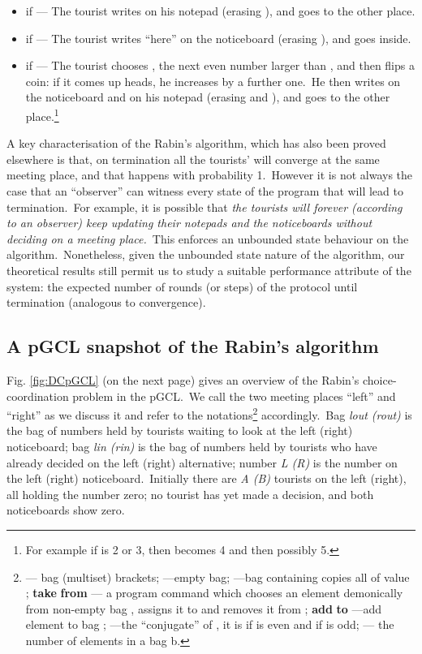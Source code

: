 \documentclass[numbers,copyright,creativecommons]{eptcs}
\begin{document}
\begin{itemize}
\item []if  --- The tourist writes  on his notepad (erasing ), and goes to the
        other place.
\item [] if  --- The tourist writes ``here'' on the noticeboard (erasing ), and
        goes inside.
\item [] if  --- The tourist chooses , the next even number larger than ,
        and then flips a coin: if it comes up heads, he increases  by a further one.\
        He then writes  on the noticeboard and on his notepad (erasing  and ),
        and goes to the other place.\footnote{For example if  is 2 or 3, then  becomes
        4 and then possibly 5.}
\end{itemize}
A key characterisation of the Rabin's algorithm, which has also been proved elsewhere \cite{ARP} is that, on termination all the tourists' will converge at the same meeting place, and that happens with probability 1.\ However it is not always the case that an ``observer'' can witness every state of the program that will
lead to termination.\ For example, it is possible that {\it the tourists will forever (according to
an observer) keep updating their notepads and the noticeboards without deciding on a meeting
place.}\ This enforces an {unbounded state} behaviour on the algorithm.\ Nonetheless, given the unbounded state nature of the algorithm,
our theoretical results still permit us to study a suitable performance attribute of the system: the expected number of rounds (or steps) of the protocol until termination (analogous to convergence).






\subsection{A pGCL snapshot of the Rabin's algorithm}
Fig. {\ref{fig:DCpGCL}} (on the next page) gives an overview of the Rabin's choice-coordination
problem in the pGCL.\ We call the two meeting places ``left'' and ``right'' as we discuss it and refer to the
notations\footnote{ --- bag (multiset) brackets;  ---empty bag; ---bag containing  copies all of value ; {\bf take}  {\bf from}  --- a program command which chooses an element demonically from non-empty bag , assigns it to  and removes it from ; {\bf add}  {\bf to}  ---add element  to bag ;  ---the ``conjugate'' of , it is  if  is even and  if  is odd;  --- the number of elements in a bag b.} accordingly.\
Bag {\it lout (rout)} is the bag of numbers held by tourists waiting to look at the left (right) noticeboard;
bag {\it lin (rin)} is the bag of numbers held by tourists who have already decided on the left (right)
alternative; number {\it L (R)} is the number on the left (right) noticeboard.\ Initially there are {\it A (B)} tourists
on the left (right), all holding the number zero; no tourist has yet made a decision, and both noticeboards
show zero.
\end{document}
